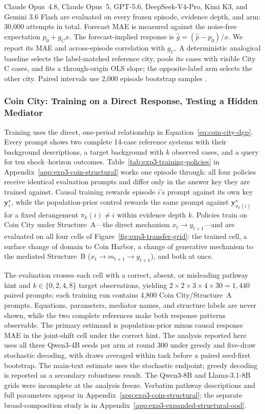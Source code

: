 Claude Opus~4.8, Claude Opus~5, GPT-5.6, DeepSeek-V4-Pro, Kimi K3, and Gemini 3.6
Flash are evaluated on every frozen episode, evidence depth, and arm: 30,000
attempts in total. Forecast MAE is measured against the noise-free expectation
$p_0+g_Cx$. The forecast-implied response is
$\hat g=(\hat p-p_0)/x$. We report its MAE and across-episode correlation with
$g_C$. A deterministic analogical baseline selects the label-matched reference
city, pools its cases with visible City C cases, and fits a through-origin OLS
slope; the opposite-label arm selects the other city. Paired intervals use 2,000
episode bootstrap samples \citep{efron1979bootstrap}.

\subsubsection{Coin City: Training on a Direct Response, Testing a Hidden Mediator}
\label{sec:methods-exp3-synthetic}



Training uses the direct, one-period relationship in
Equation~\ref{eq:coin-city-dgp}. Every prompt shows two complete 14-case reference
systems with their background descriptions, a target background with $k$ observed
cases, and a query for ten shock--horizon outcomes.
Table~\ref{tab:exp3-training-policies} in Appendix~\ref{app:exp3-coin-structural}
works one episode through: all four policies receive identical evaluation prompts
and differ only in the answer key they are trained against. Causal training rewards episode $i$'s prompt against its
own key $\mathbf y^\star_i$, while the population-prior control rewards the same
prompt against $\mathbf y^\star_{\pi_k(i)}$ for a fixed derangement
$\pi_k(i)\neq i$ within evidence depth $k$. Policies train on Coin
City under Structure~A---the direct mechanism $x_t\to y_{t+1}$---and are evaluated
on all four cells of Figure~\ref{fig:exp3-transfer-grid}: the trained cell, a
surface change of domain to Coin Harbor, a change of generative mechanism to the
mediated Structure~B ($x_t\to m_{t+1}\to y_{t+1}$), and both at once.

The evaluation crosses each cell with a correct, absent, or misleading pathway
hint and $k\in\{0,2,4,8\}$ target observations,
yielding $2\times2\times3\times4\times30=1{,}440$ paired prompts; each training run
contains 4,800 Coin City/Structure~A prompts. Equations, parameters, mediator
names, and structure labels are never shown, while the two complete references make
both response patterns observable. The primary estimand is population-prior minus
causal response MAE in the joint-shift cell under the correct hint. The analysis
reported here uses all three Qwen3-4B seeds per arm at round 300 under greedy and
five-draw stochastic decoding, with draws averaged within task before a paired
seed-first bootstrap. The main-text estimate uses the stochastic endpoint;
greedy decoding is reported as a secondary robustness result. The Qwen3-8B and
Llama-3.1-8B grids were incomplete at the analysis freeze.
Verbatim pathway descriptions and full parameters appear in
Appendix~\ref{app:exp3-coin-structural}; the separate broad-composition study is in
Appendix~\ref{app:exp3-expanded-structural-ood}.

